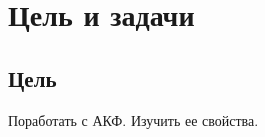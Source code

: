 \chapter*{Цель и задачи}
\label{ch:intro}

\section{Цель}
Поработать с АКФ. Изучить ее свойства.
\endinput